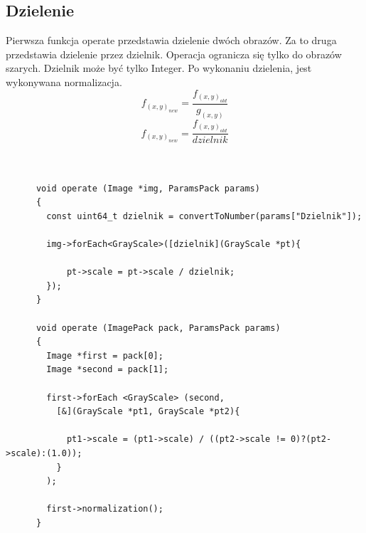 \documentclass{article}
\begin{document}
\FloatBarrier
\subsection{Dzielenie}
Pierwsza funkcja operate przedstawia dzielenie dwóch obrazów. Za to druga przedstawia dzielenie przez dzielnik. Operacja ogranicza się tylko do obrazów szarych. Dzielnik może być tylko Integer.
Po wykonaniu dzielenia, jest wykonywana normalizacja.
\begin{equation*}
f_(x,y)_{new} = \frac{f_(x,y)_{old}}{g_(x,y)}
\end{equation*}
\begin{equation*}
f_(x,y)_{new} = \frac{f_(x,y)_{old}}{dzielnik}
\end{equation*}\\
\begin{Verbatim}[frame=single,label=Dzielenie (Source Code)]

      void operate (Image *img, ParamsPack params)
      {
        const uint64_t dzielnik = convertToNumber(params["Dzielnik"]);

        img->forEach<GrayScale>([dzielnik](GrayScale *pt){
        
            pt->scale = pt->scale / dzielnik;
        });
      }

      void operate (ImagePack pack, ParamsPack params)
      {
        Image *first = pack[0];
        Image *second = pack[1];

        first->forEach <GrayScale> (second,
          [&](GrayScale *pt1, GrayScale *pt2){
          
            pt1->scale = (pt1->scale) / ((pt2->scale != 0)?(pt2->scale):(1.0));
          }
        );

        first->normalization();
      }

\end{Verbatim}
\end{document}
